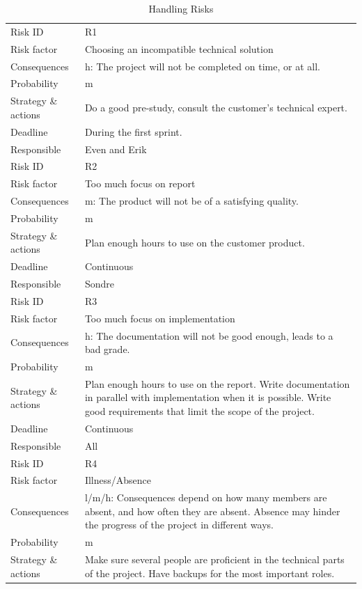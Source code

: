 \begin{longtable}{>{\footnotesize}p{} >{\footnotesize}p{}}
	\caption{Handling Risks}
	\endhead
	\toprule
	Risk ID & R1 \\
	Risk factor & Choosing an incompatible technical solution \\
	Consequences & \Gls{h}: The project will not be completed on time, or at all. \\
	Probability & \Gls{m} \\ 
	Strategy \& actions & Do a good pre-study, consult the customer’s technical expert. \\
	Deadline & During the first sprint.\\
	Responsible & Even and Erik \\
	\midrule
	Risk ID & R2 \\
	Risk factor & Too much focus on report \\
	Consequences & \Gls{m}: The product will not be of a satisfying quality. \\
	Probability & \Gls{m} \\ 
	Strategy \& actions & Plan enough hours to use on the customer product.\\
	Deadline & Continuous\\
	Responsible & Sondre \\
	\midrule
	Risk ID & R3 \\
	Risk factor & Too much focus on implementation \\
	Consequences & \Gls{h}: The documentation will not be good enough, leads to a bad grade. \\
	Probability & \Gls{m} \\ 
	Strategy \& actions & Plan enough hours to use on the report. Write documentation in parallel with implementation when it is possible. Write good requirements that limit the scope of the project. \\
	Deadline & Continuous \\
	Responsible & All \\
	\midrule
	Risk ID & R4 \\
	Risk factor & Illness/Absence \\
	Consequences & \Gls{l}/\Gls{m}/\Gls{h}: Consequences depend on how many members are absent, and how often they are absent. Absence may hinder the progress of the project in different ways.  \\
	Probability & \Gls{m} \\ 
	Strategy \& actions & Make sure several people are proficient in the technical parts of the project. Have backups for the most important roles. \\

\end{longtable}
